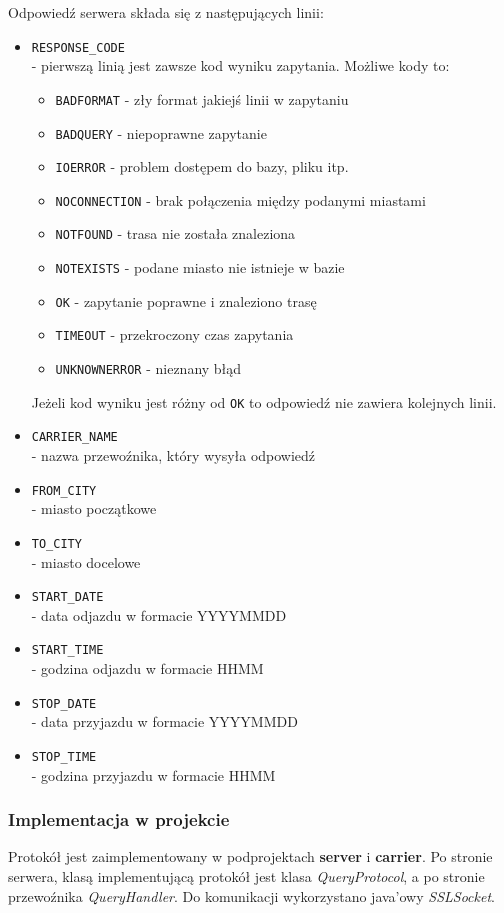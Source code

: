 \documentclass[pdftex,13pt,a4paper]{article}
\begin{document}
Odpowiedź serwera składa się z następujących linii:
\begin{itemize}
\item \texttt{RESPONSE\_CODE}\\
- pierwszą linią jest zawsze kod wyniku zapytania. 
Możliwe kody to:
\begin{itemize}
\item \texttt{BADFORMAT} - zły format jakiejś linii w zapytaniu
\item \texttt{BADQUERY} - niepoprawne zapytanie
\item \texttt{IOERROR} - problem dostępem do bazy, pliku itp.
\item \texttt{NOCONNECTION} - brak połączenia między podanymi miastami
\item \texttt{NOTFOUND} - trasa nie została znaleziona
\item \texttt{NOTEXISTS} - podane miasto nie istnieje w bazie
\item \texttt{OK} - zapytanie poprawne i znaleziono trasę
\item \texttt{TIMEOUT} - przekroczony czas zapytania
\item \texttt{UNKNOWNERROR} - nieznany błąd
\end{itemize}
Jeżeli kod wyniku jest różny od \texttt{OK} to odpowiedź nie zawiera kolejnych linii.
\item \texttt{CARRIER\_NAME}\\
- nazwa przewoźnika, który wysyła odpowiedź
\item \texttt{FROM\_CITY}\\
- miasto początkowe
\item \texttt{TO\_CITY}\\
- miasto docelowe
\item \texttt{START\_DATE}\\
- data odjazdu w formacie YYYYMMDD
\item \texttt{START\_TIME}\\
- godzina odjazdu w formacie HHMM
\item \texttt{STOP\_DATE}\\
- data przyjazdu w formacie YYYYMMDD
\item \texttt{STOP\_TIME}\\
- godzina przyjazdu w formacie HHMM
\end{itemize}

\subsubsection{Implementacja w projekcie}
Protokół jest zaimplementowany w podprojektach \textbf{server} i \textbf{carrier}. Po stronie serwera, klasą implementującą protokół jest klasa \textit{QueryProtocol}, a po stronie przewoźnika \textit{QueryHandler}. Do komunikacji wykorzystano java'owy \textit{SSLSocket}.
\end{document}
